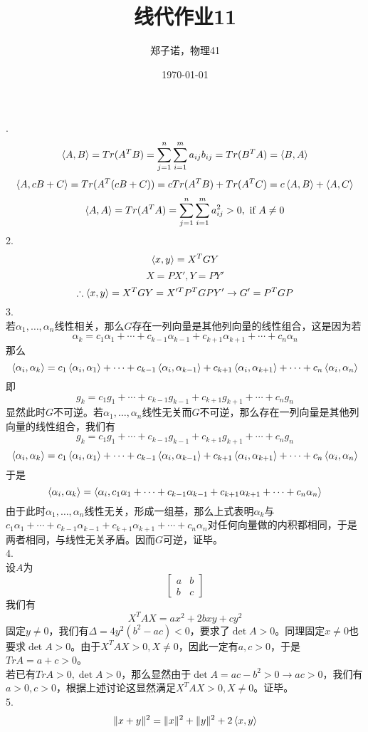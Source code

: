\documentclass[utf8]{ctexart}
\title{线代作业11}
\author{郑子诺，物理41}
\date{\today}
\begin{document}
\maketitle
{}.\\
\[\braket{A,B}=Tr(A^TB)=\sum_{j=1}^n\sum_{i=1}^ma_{ij}b_{ij}=Tr(B^TA)=\braket{B,A}\]
\[\braket{A,cB+C}=Tr(A^T(cB+C))=cTr(A^TB)+Tr(A^TC)=c\braket{A,B}+\braket{A,C}\]
\[\braket{A,A}=Tr(A^TA)=\sum_{j=1}^n\sum_{i=1}^ma^2_{ij}>0,\text{ if }A\neq0\]
2.\\
\[\braket{x,y}=X^TGY\]
\[X=PX',Y=PY'\]
\[\therefore\braket{x,y}=X^TGY=X'^TP^TGPY'\rightarrow G'=P^TGP\]
3.\\
若$\alpha_1,\dots,\alpha_n$线性相关，那么$G$存在一列向量是其他列向量的线性组合，这是因为若
\[\alpha_k=c_1\alpha_1+\cdots+c_{k-1}\alpha_{k-1}+c_{k+1}\alpha_{k+1}+\cdots+c_n\alpha_n\]
那么
\[\braket{\alpha_i,\alpha_k}=c_1\braket{\alpha_i,\alpha_1}+\cdots+c_{k-1}\braket{\alpha_i,\alpha_{k-1}}+c_{k+1}\braket{\alpha_i,\alpha_{k+1}}+\cdots+c_n\braket{\alpha_i,\alpha_{n}}\]
即
\[g_k=c_1g_1+\cdots+c_{k-1}g_{k-1}+c_{k+1}g_{k+1}+\cdots+c_ng_n\]
显然此时$G$不可逆。若$\alpha_1,\dots,\alpha_n$线性无关而$G$不可逆，那么存在一列向量是其他列向量的线性组合，我们有
\[g_k=c_1g_1+\cdots+c_{k-1}g_{k-1}+c_{k+1}g_{k+1}+\cdots+c_ng_n\]
\[\braket{\alpha_i,\alpha_k}=c_1\braket{\alpha_i,\alpha_1}+\cdots+c_{k-1}\braket{\alpha_i,\alpha_{k-1}}+c_{k+1}\braket{\alpha_i,\alpha_{k+1}}+\cdots+c_n\braket{\alpha_i,\alpha_{n}}\]
于是
\[\braket{\alpha_i,\alpha_k}=\braket{\alpha_i,c_1\alpha_1+\cdots+c_{k-1}\alpha_{k-1}+c_{k+1}\alpha_{k+1}+\cdots+c_n\alpha_{n}}\]
由于此时$\alpha_1,\dots,\alpha_n$线性无关，形成一组基，那么上式表明$\alpha_k$与$c_1\alpha_1+\cdots+c_{k-1}\alpha_{k-1}+c_{k+1}\alpha_{k+1}+\cdots+c_n\alpha_{n}$对任何向量做的内积都相同，于是两者相同，与线性无关矛盾。因而$G$可逆，证毕。\\
4.\\
设$A$为
\[\begin{bmatrix}
	a&b\\
	b&c
\end{bmatrix}\]
我们有
\[X^TAX=ax^2+2bxy+cy^2\]
固定$y\neq0$，我们有$\Delta=4y^2(b^2-ac)<0$，要求了$\det A>0$。同理固定$x\neq0$也要求$\det A>0$。由于$X^TAX>0,X\neq0$，因此一定有$a,c>0$，于是$TrA=a+c>0$。\\
若已有$TrA>0,\det A>0$，那么显然由于$\det A=ac-b^2>0\rightarrow ac>0$，我们有$a>0,c>0$，根据上述讨论这显然满足$X^TAX>0,X\neq0$。证毕。\\
5.\\
\[\Vert x+y\Vert^2=\Vert x\Vert^2+\Vert y\Vert^2+2\braket{x,y}\]
\end{document}
